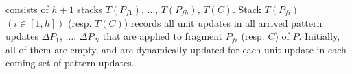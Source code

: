 \vspace{0.5ex}
 consists of $h+1$ stacks $T({P}_{f1})$, $\ldots$, $T({P}_{fh})$, $T(C)$.
Stack $T(P_{fi})$ $(i\in [1,h])$ (resp. $T(C)$) records all unit updates in all arrived pattern updates $\Delta P_1$, $\ldots$, $\Delta P_{N}$ that are applied to fragment $P_{fi}$ (resp. $C$) of $P$.
Initially, all of them are empty, and are dynamically updated for each unit update in each coming set of  pattern updates.












